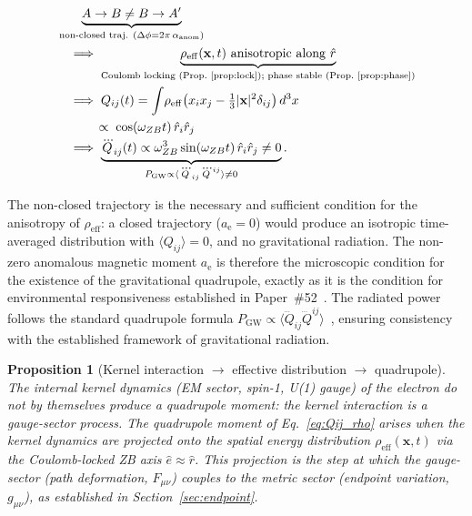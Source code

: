 \documentclass[%
 reprint, amsmath,amssymb, aps, prd, ]{revtex4-2}
\numberwithin{equation}{section}
\newtheorem{proposition}[theorem]{Proposition}
\newcommand{\anom}{a_{\mathrm{e}}}
\begin{document}
\begin{align}
&\underbrace{A \to B \neq B \to A'}_{\text{non-closed traj. }(\Delta\phi = 2\pi\,\alpha_{\mathrm{anom}})}
\notag\\
&\quad\Longrightarrow\;
\underbrace{
  \rho_\mathrm{eff}(\mathbf{x},t)\ \text{anisotropic along } \hat{r}
}_{\text{Coulomb locking (Prop.~\ref{prop:lock}); phase stable (Prop.~\ref{prop:phase})}}
\notag\\
&\quad\Longrightarrow\;
Q_{ij}(t)
= \int\!\rho_\mathrm{eff}
  \!\left(x_ix_j - \tfrac{1}{3}|\mathbf{x}|^2\delta_{ij}\right)d^3x
\notag\\
&\qquad\quad\propto\; \cos(\omega_{ZB} t)\,\hat{r}_i\hat{r}_j
\notag\\
&\quad\Longrightarrow\;
\underbrace{
  \dddot{Q}_{ij}(t) \propto \omega_{ZB}^3\sin(\omega_{ZB} t)\,\hat{r}_i\hat{r}_j \neq 0
}_{P_\mathrm{GW} \propto \langle {\dddot{Q}}_{ij}{\dddot{Q}}^{ij}\rangle \neq 0}.
\label{eq:full_quad_chain}
\end{align}

The non-closed trajectory is the necessary and sufficient condition for the anisotropy of $\rho_\mathrm{eff}$: a closed trajectory ($\anom = 0$) would produce an isotropic time-averaged distribution with $\langle Q_{ij}\rangle = 0$, and no gravitational radiation.
The non-zero anomalous magnetic moment $\anom$ is therefore the microscopic condition for the existence of the gravitational quadrupole, exactly as it is the condition for environmental responsiveness established in Paper~\#52~\cite{hanamura52}.
The radiated power follows the standard quadrupole formula $P_\mathrm{GW} \propto \langle \dddot{Q}_{ij}\dddot{Q}^{ij}\rangle$~\cite{Peters1963}, ensuring consistency with the established framework of gravitational radiation.

\begin{proposition}[Kernel interaction $\to$ effective distribution $\to$ quadrupole]
\label{prop:kernel_quadrupole}
The internal kernel dynamics (EM sector, spin-1, U(1) gauge) of the electron do not by themselves produce a quadrupole moment: the kernel interaction is a gauge-sector process.
The quadrupole moment of Eq.~\eqref{eq:Qij_rho} arises when the kernel dynamics are projected onto the spatial energy distribution $\rho_\mathrm{eff}(\mathbf{x},t)$ via the Coulomb-locked ZB axis $\hat{e} \approx \hat{r}$.
This projection is the step at which the gauge-sector (path deformation, $F_{\mu\nu}$) couples to the metric sector (endpoint variation, $g_{\mu\nu}$), as established in Section~\ref{sec:endpoint}.
\end{proposition}
\end{document}
